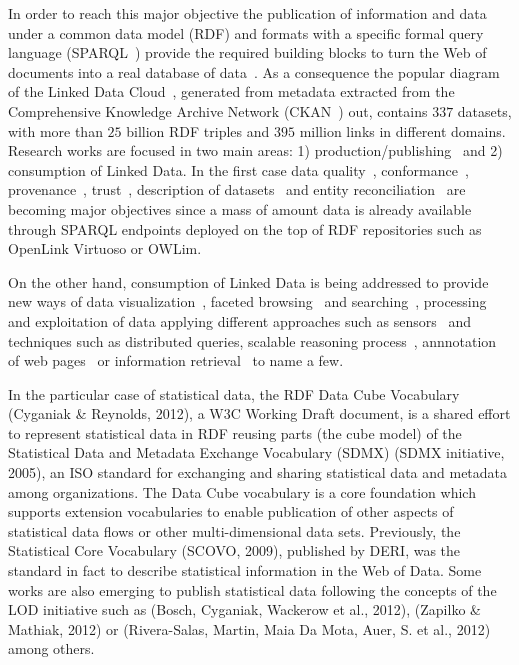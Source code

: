 \documentclass{llncs}
\begin{document}
In order to reach this major objective the publication of information and data under a common data model (RDF) and formats with 
a specific formal query language (SPARQL~\cite{Sparql11}) provide the required building blocks to turn the Web of documents 
into a real database of data~\cite{freebase}. As a consequence the popular diagram of the Linked Data Cloud~\cite{linked-data-cloud}, 
generated from metadata extracted from the Comprehensive Knowledge Archive Network (CKAN~\cite{ckan}) out, 
contains $337$ datasets, with more than $25$ billion RDF triples and $395$ million links in different  domains. 
Research works are focused in two main areas: 1) production/publishing~\cite{bizer07how} and 2) consumption of  Linked Data. 
In the first case data quality~\cite{bizer2007,wiqa,ld-quality,lodq,link-qa}, conformance~\cite{HoganUHCPD:2012:237}, 
provenance~\cite{w3c-prov,DBLP:conf/ipaw/HartigZ10}, trust~\cite{Carroll05namedgraphs}, description of datasets~\cite{void,Cyganiak08semanticsitemaps,ckanValidator} and 
entity reconciliation~\cite{Serimi,Maali_Cyganiak_2011} are becoming major objectives since a mass of amount data is already available~\cite{Triplify} 
through SPARQL endpoints deployed on the top of RDF repositories such as OpenLink Virtuoso or OWLim. 

On the other hand, consumption of Linked Data is being addressed to provide new ways of data visualization~\cite{DBLP:journals/semweb/DadzieR11,hoga-etal-2011-swse-JWS}, 
faceted browsing~\cite{Pietriga06fresnel,citeulike:8529753,Sparallax} and searching~\cite{hoga-etal-2011-swse-JWS}, processing~\cite{Harth:2011:SIP:1963192.1963318} and exploitation of data applying 
different approaches such as sensors~\cite{Jeung:2010:EMM:1850003.1850235,ontology-search} and techniques  such as distributed 
queries\cite{Hartig09executingsparql,Ankolekar07thetwo,sparqlOpt}, scalable reasoning process~\cite{DBLP:conf/semweb/UrbaniKOH09,HoganHarthPolleres2009,DBLP:conf/semweb/HoganPPD10}, 
annnotation of web pages~\cite{rdfa-primer} or information retrieval~\cite{Pound} to name a few.

In the particular case of statistical data, the RDF Data Cube Vocabulary (Cyganiak \& Reynolds, 2012), 
a W3C Working Draft document, is a shared effort to represent statistical data in RDF reusing parts (the cube model) 
of the Statistical Data and Metadata Exchange Vocabulary (SDMX) (SDMX initiative, 2005), an ISO standard 
for exchanging and sharing statistical data and metadata among organizations. The Data Cube vocabulary is a core 
foundation which supports extension vocabularies to enable publication of other aspects of statistical data flows or 
other multi-dimensional data sets. Previously, the Statistical Core Vocabulary (SCOVO, 2009), published by DERI,
was the standard in fact to describe statistical information in the Web of Data. Some works are also emerging 
to publish statistical data following the concepts of the LOD initiative such as (Bosch, Cyganiak, Wackerow et al., 2012), (Zapilko \& Mathiak, 2012) or 
(Rivera-Salas, Martin,  Maia Da Mota,  Auer, S. et al., 2012) among others.
\end{document}
